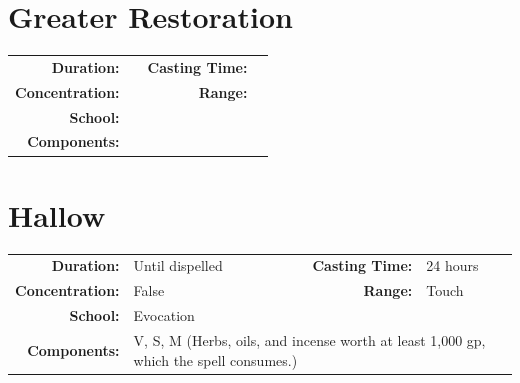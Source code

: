 \documentclass[12pt,showtrims]{memoir}
\begin{document}
\section*{Greater Restoration}
{
\small\centering\vspace{-6pt}
\begin{tabular}{rlrl}
\toprule

\textbf{Duration:} &  &
\textbf{Casting Time:} &  \\
\textbf{Concentration:} & &
\textbf{Range:} &  \\
\textbf{School:} &  \\
\textbf{Components:} & \multicolumn{3}{p{0.7\textwidth}}{}\\

\bottomrule
\end{tabular}
}
\newpage
\section*{Hallow}

{
\small\centering\vspace{-6pt}
\begin{tabular}{rlrl}
\toprule

\textbf{Duration:} & Until dispelled &
\textbf{Casting Time:} & 24 hours \\
\textbf{Concentration:} & False &
\textbf{Range:} & Touch \\
\textbf{School:} & Evocation \\
\textbf{Components:} & \multicolumn{3}{p{0.7\textwidth}}{V, S, M (Herbs, oils, and incense worth at least 1,000 gp, which the spell consumes.)}\\

\bottomrule
\end{tabular}
}
\end{document}
